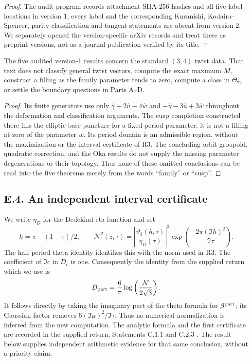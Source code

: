 \begin{proof}
The audit program records attachment SHA-256 hashes and all five
label locations in version 1; every label and the corresponding
Kuranishi, Kodaira--Spencer, parity-classification and tangent
statements are absent from version 2.  We separately opened the
version-specific arXiv records and treat these as preprint
versions, not as a journal publication verified by its title.
\end{proof}

\begin{proposition}\label{push:src:E.3.3}
The five audited version-1 results concern the standard
$(3,4)$ twist data.  That text does not classify general twist
vectors, compute the exact maximum $M$, construct a filling as
the family parameter tends to zero, compute a class in
$\Theta_7$, or settle the boundary questions in Parts A--D.
\end{proposition}
\begin{proof}
Its finite generators use only
$\widehat\gamma+2\widehat u-4\widehat w$ and
$-\widehat\gamma-3\widehat u+3\widehat w$ throughout the
deformation and classification arguments.  The cusp completion
constructed there fills the elliptic-base puncture for a fixed
period parameter; it is not a filling at zero of the parameter
$w$.  Its period domain is an admissible region, without the
maximization or the interval certificate of R3.  The concluding
orbit groupoid, quadratic correction, and the Oka results do not
supply the missing parameter degenerations or their topology.
Thus none of these omitted conclusions can be read into the
five theorems merely from the words ``family'' or ``cusp''.
\end{proof}

\subsection{E.4. An independent interval certificate}
\label{sec:e4}

We write $\eta_D$ for the Dedekind eta function and set
\[
 h=z-(1-\tau)/2,\qquad
 \mathcal N^2(z,\tau)=
 \left|\frac{\vartheta_3(h,\tau)}{\eta_D(\tau)}\right|^2
 \exp\left(-\frac{2\pi(\Im h)^2}{\Im\tau}\right).
\]
The half-period theta identity identifies this with the norm used in
R3. The coefficient of $\Im c$ in $D_c$ is one. Consequently the
identity from the supplied return which we use is
\[
 D_{\rm part}=\frac6\pi
 \log\left(\frac{\mathcal N}{2\sqrt3}\right).
\]
It follows directly by taking the imaginary part of the theta formula
for $\beta^{\rm part}$; its Gaussian factor removes
$6(\Im\mu)^2/\Im\tau$. Thus no numerical normalization is inferred
from the new computation. The analytic formula and the first
certificate are recorded in the supplied return, Statements C.1.1
and C.2.3 \citep{family2026}. The result below supplies independent
arithmetic evidence for that same conclusion, without a priority claim.

